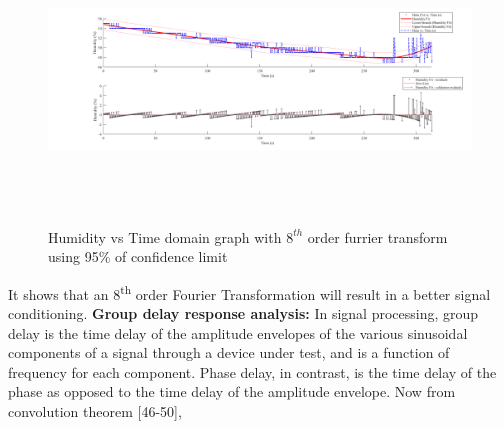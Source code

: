 \begin{figure}[H]
	\begin{Center}
		\includegraphics[width=6.5in,height=3in]{21}
	\end{Center}
\caption{Humidity vs Time domain graph with $8^{th}$ order furrier transform using 95\% of confidence limit}
\end{figure}
It shows that an 8\textsuperscript{th} order Fourier Transformation will result in a better signal conditioning.
\textbf{Group delay response analysis:} In signal processing, group delay is the time delay of the amplitude envelopes of the various
sinusoidal components of a signal through a device under test, and is a function of frequency for each component. Phase delay, in contrast, is the time delay of the phase as opposed to the time delay of the amplitude envelope. Now from convolution theorem [46-50],\par


